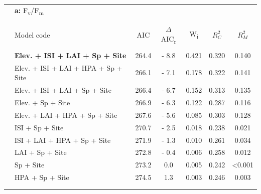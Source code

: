 \documentclass[a4paper,10pt,]{report}
\begin{document}
\begin{table}[H] \centering 
  \label{} 
\begin{tabular}{@{\extracolsep{5pt}} clSSSSS} 
& \textbf{\Large{a:}} F\textsubscript{v}/F\textsubscript{m} &&&&&\\
\\[-1.8ex]\hline 
\hline \\[-1.8ex] 
 & Model code  & {AIC} & {$\Delta$AIC\textsubscript{r}} & {W\textsubscript{i}} & {$R_C^2$} & {$R_M^2$} \\ 
\hline \\[-1.8ex] 
 & \textbf{Elev. + ISI + LAI + Sp + Site} &  264.4  &   - 8.8  &  0.421  &  0.320  &  0.140  \\ 
 & Elev. + ISI + LAI + HPA + Sp + Site &  266.1  &   - 7.1  &  0.178  &  0.322  &  0.141  \\ 
 & Elev. + ISI + LAI + Sp + Site &  266.4  &   - 6.7  &  0.152  &  0.313  &  0.135  \\ 
 & Elev. + Sp + Site &  266.9  &   - 6.3  &  0.122  &  0.287  &  0.116  \\ 
 & Elev. + LAI + HPA + Sp + Site &  267.6  &   - 5.6  &  0.085  &  0.303  &  0.128  \\ 
 & ISI + Sp + Site  &  270.7  &   - 2.5  &  0.018  &  0.238  &  0.021  \\ 
 & ISI + LAI + HPA + Sp + Site &  271.9  &   - 1.3  &  0.010  &  0.261  &  0.034  \\ 
 & LAI + Sp + Site &  272.8  &   - 0.4  &  0.006  &  0.258  &  0.012  \\ 
 & Sp + Site &  273.2  &  0.0  &  0.005  &  0.242  &  <0.001  \\ 
 & HPA + Sp + Site &  274.5  &  1.3  &  0.003  &  0.246  &  0.003  \\ 
\hline \\[-1.8ex]
\hline \\
\end{tabular} 
\end{table} 
\end{document}
